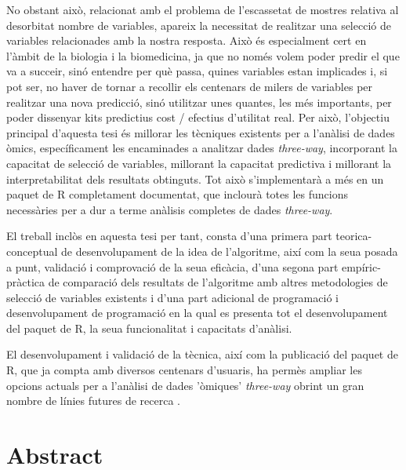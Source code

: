 No obstant això, relacionat amb el problema de l'escassetat de mostres relativa al desorbitat nombre de variables, apareix la necessitat de realitzar una selecció de variables relacionades amb la nostra resposta. Això és especialment cert en l'àmbit de la biologia i la biomedicina, ja que no només volem poder predir el que va a succeir, sinó entendre per què passa, quines variables estan implicades i, si pot ser, no haver de tornar a recollir els centenars de milers de variables per realitzar una nova predicció, sinó utilitzar unes quantes, les més importants, per poder dissenyar kits predictius cost / efectius d'utilitat real. Per això, l'objectiu principal d'aquesta tesi és millorar les tècniques existents per a l'anàlisi de dades òmics, específicament les encaminades a analitzar dades \textit{three-way}, incorporant la capacitat de selecció de variables, millorant la capacitat predictiva i millorant la interpretabilitat dels resultats obtinguts. Tot això s'implementarà a més en un paquet de R completament documentat, que inclourà totes les funcions necessàries per a dur a terme anàlisis completes de dades \textit{three-way}.

El treball inclòs en aquesta tesi per tant, consta d'una primera part teorica-conceptual de desenvolupament de la idea de l'algoritme, així com la seua posada a punt, validació i comprovació de la seua eficàcia, d'una segona part empíric-pràctica de comparació dels resultats de l'algoritme amb altres metodologies de selecció de variables existents i d'una part adicional de programació i desenvolupament de programació en la qual es presenta tot el desenvolupament del paquet de R, la seua funcionalitat i capacitats d'anàlisi.

El desenvolupament i validació de la tècnica, així com la publicació del paquet de R, que ja compta amb diversos centenars d'usuaris, ha permès ampliar les opcions actuals per a l'anàlisi de dades 'òmiques' \textit{three-way} obrint un gran nombre de línies futures de recerca .


\ifEBOOKPDF
	\bigskip
\else
	\vfill
\fi


\chapter*{Abstract}



